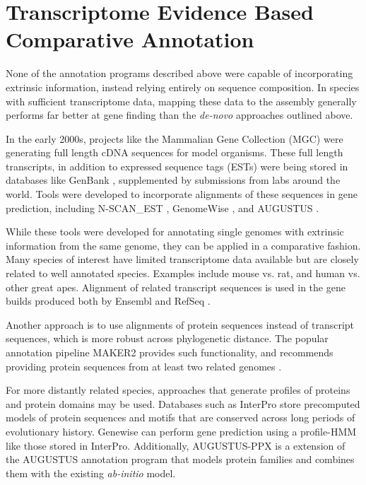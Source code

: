 \documentclass[fleqn,10pt]{wlscirep}
\begin{document}
\section{Transcriptome Evidence Based Comparative Annotation}

None of the annotation programs described above were capable of incorporating extrinsic information, instead relying entirely on sequence composition. In species with sufficient transcriptome data, mapping these data to the assembly generally performs far better at gene finding than the \textit{de-novo} approaches outlined above. 

In the early 2000s, projects like the Mammalian Gene Collection (MGC) \cite{mammalian2002generation} were generating full length cDNA sequences for model organisms. These full length transcripts, in addition to expressed sequence tags (ESTs) were being stored in databases like GenBank \cite{benson2000genbank}, supplemented by submissions from labs around the world. Tools were developed to incorporate alignments of these sequences in gene prediction, including N-SCAN\_EST \cite{wei2006using},  GenomeWise \cite{birney2004genewise}, and AUGUSTUS \cite{stanke2008using}.

While these tools were developed for annotating single genomes with extrinsic information from the same genome, they can be applied in a comparative fashion. Many species of interest have limited transcriptome data available but are closely related to well annotated species. Examples include mouse vs. rat, and human vs. other great apes. Alignment of related transcript sequences is used in the gene builds produced both by Ensembl \cite{Aken01012016} and RefSeq \cite{pruitt2006ncbi}.

Another approach is to use alignments of protein sequences instead of transcript sequences, which is more robust across phylogenetic distance. The popular annotation pipeline MAKER2 \cite{cantarel2008maker} provides such functionality, and recommends providing protein sequences from at least two related genomes \cite{yandell2012beginner}. 

For more distantly related species, approaches that generate profiles of proteins and protein domains may be used. Databases such as InterPro \cite{zdobnov2001interproscan} store precomputed models of protein sequences and motifs that are conserved across long periods of evolutionary history. Genewise \cite{birney2004genewise} can perform gene prediction using a profile-HMM like those stored in InterPro. Additionally, AUGUSTUS-PPX \cite{keller2011novel} is a extension of the AUGUSTUS annotation program that models protein families and combines them with the existing \textit{ab-initio} model.
\end{document}
